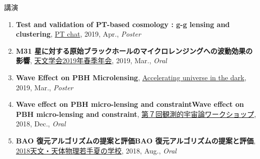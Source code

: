\begin{rSection}{講演}
\begin{enumerate}
\item \textbf{Test and validation of PT-based cosmology : g-g lensing and clustering}, \href{http://pt-chat-kyoto.sciencesconf.org/}{PT chat}, 2019, Apr., \textit{Poster}
\item \textbf{M31 星に対する原始ブラックホールのマイクロレンジングへの波動効果の影響}, \href{https://www.asj.or.jp/nenkai/archive/2019a/pdf/U14a.pdf}{天文学会2019年春季年会}, 2019, Mar., \textit{Oral}
\item \textbf{Wave Effect on PBH Microlensing}, \href{http://www2.yukawa.kyoto-u.ac.jp/~aud2019/index.php}{Accelerating universe in the dark}, 2019, Mar., \textit{Poster}
\item \textbf{Wave effect on PBH micro-lensing and constraintWave effect on PBH micro-lensing and constraint}, \href{http://web.cc.yamaguchi-u.ac.jp/~rsaito/obscosmo2018/}{第７回観測的宇宙論ワークショップ}, 2018, Dec., \textit{Oral}
\item \textbf{BAO 復元アルゴリズムの提案と評価BAO 復元アルゴリズムの提案と評価}, \href{http://www.astro-wakate.org/ss2018/web/link.html}{2018天文・天体物理若手夏の学校}, 2018, Aug., \textit{Oral}
\end{enumerate}\end{rSection}

